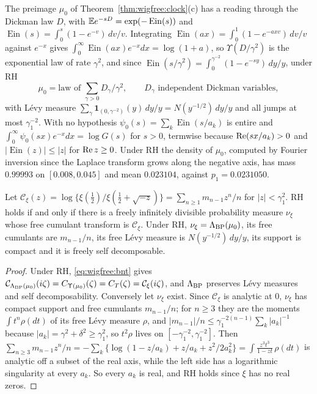 \begin{resultpar}
The preimage $\mu_0$ of Theorem~\ref{thm:wigfree:clock}(c) has a reading through the Dickman law $D$, with $\mathbb{E} e^{-sD}=\exp(-\operatorname{Ein}(s))$ and $\operatorname{Ein}(s)=\int_0^s(1-e^{-v})\,dv/v$. Integrating $\operatorname{Ein}(ax)=\int_0^1(1-e^{-axv})\,dv/v$ against $e^{-x}$ gives $\int_0^\infty\operatorname{Ein}(ax)e^{-x}dx=\log(1+a)$, so $\Upsilon(D/\gamma^2)$ is the exponential law of rate $\gamma^2$, and since $\operatorname{Ein}(s/\gamma^2)=\int_0^{\gamma^{-2}}(1-e^{-sy})\,dy/y$, under RH
\[
\mu_0=\text{law of }\sum_{\gamma>0}D_\gamma/\gamma^2,\qquad D_\gamma\text{ independent Dickman variables},
\]
with L\'evy measure $\sum_\gamma\mathbf 1_{(0,\gamma^{-2})}(y)\,dy/y=N(y^{-1/2})\,dy/y$ and all jumps at most $\gamma_1^{-2}$. With no hypothesis $\psi_0(s)=\sum_k\operatorname{Ein}(s/a_k)$ is entire and $\int_0^\infty\psi_0(sx)e^{-x}dx=\log G(s)$ for $s>0$, termwise because $\operatorname{Re}(sx/a_k)>0$ and $|\operatorname{Ein}(z)|\le|z|$ for $\operatorname{Re} z\ge0$. Under RH the density of $\mu_0$, computed by Fourier inversion since the Laplace transform grows along the negative axis, has mass $0.99993$ on $[0.008,0.045]$ and mean $0.023104$, against $p_1=0.0231050$.\label{tx3:res:dickman}
\end{resultpar}

\begin{proposition}\label{tx2:prop:free}
Let $\mathcal C_\xi(z)=\log\{\xi(\frac12)/\xi(\frac12+\sqrt{-z})\}=\sum_{n\ge1}m_{n-1}z^n/n$ for $|z|<\gamma_1^2$. RH holds if and only if there is a freely infinitely divisible probability measure $\nu_\xi$ whose free cumulant transform is $\mathcal C_\xi$. Under RH, $\nu_\xi=\Lambda_{\rm BP}(\mu_0)$, its free cumulants are $m_{n-1}/n$, its free L\'evy measure is $N(y^{-1/2})\,dy/y$, its support is compact and it is freely self decomposable.
\end{proposition}

\begin{proof}
Under RH, \eqref{eq:wigfree:bnt} gives $\mathcal C_{\Lambda_{\rm BP}(\mu_0)}(i\zeta)=C_{\Upsilon(\mu_0)}(\zeta)=C_T(\zeta)=\mathcal C_\xi(i\zeta)$, and $\Lambda_{\rm BP}$ preserves L\'evy measures and self decomposability. Conversely let $\nu_\xi$ exist. Since $\mathcal C_\xi$ is analytic at $0$, $\nu_\xi$ has compact support and free cumulants $m_{n-1}/n$; for $n\ge3$ they are the moments $\int t^n\rho(dt)$ of its free L\'evy measure $\rho$, and $|m_{n-1}|/n\le\gamma_1^{-2(n-1)}\sum_k|a_k|^{-1}$ because $|a_k|=\gamma^2+\delta^2\ge\gamma_1^2$, so $t^2\rho$ lives on $[-\gamma_1^{-2},\gamma_1^{-2}]$. Then $\sum_{n\ge3}m_{n-1}z^n/n=-\sum_k\{\log(1-z/a_k)+z/a_k+z^2/2a_k^2\}=\int\frac{z^3t^3}{1-zt}\,\rho(dt)$ is analytic off a subset of the real axis, while the left side has a logarithmic singularity at every $a_k$. So every $a_k$ is real, and RH holds since $\xi$ has no real zeros.
\end{proof}

